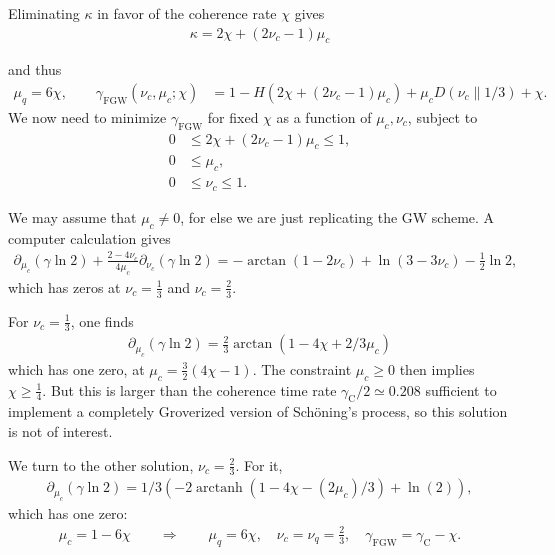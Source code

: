 \documentclass[a4paper,aps,floatfix]{revtex4}
\DeclareMathOperator\arctanh{arctanh}
\begin{document}
Eliminating $\kappa$ in favor of the coherence rate $\chi$ gives
\begin{align*}
	\kappa = 2\chi + (2\nu_c-1)\mu_c
\end{align*}

and thus
\begin{align*}
	\mu_q = 
	6\chi,
	\qquad
	\gamma_{\textrm{FGW}}(\nu_c,\mu_c;\chi) 
	&= 
	1- H( 2 \chi + (2\nu_c-1)\mu_c )
	+ 
	\mu_c D(\nu_c\parallel 1/3)
	+
	\chi.
\end{align*}
We now need to minimize $\gamma_{\textrm{FGW}}$ for fixed $\chi$ as a function of $\mu_c, \nu_c$, subject to
\begin{align*}
	0&\leq
	2\chi + (2\nu_c-1)\mu_c \leq 1, \\
	0 &\leq \mu_c, \\
	0 &\leq \nu_c \leq 1. 
\end{align*}

We may assume that $\mu_c\neq 0$, for else we are just replicating the GW scheme.
A computer calculation \cite{our-data} gives
\begin{align*}
	\partial_{\mu_c} 
	(\gamma \ln 2)
	+ 
	\frac{2-4\nu_c}{4\mu_c} 
	\partial_{\nu_c} 
	(\gamma \ln 2)
	=
	-\arctan(1-2\nu_c) + \ln(3-3\nu_c) - \frac12\ln2,
\end{align*}
which has zeros at $\nu_c=\frac13$ and $\nu_c=\frac23$.

For $\nu_c=\frac13$, one finds
\begin{align*}
	\partial_{\mu_c}
	(\gamma \ln 2)
	=
	\frac23 \arctan(1-4\chi+2/3 \mu_c)
\end{align*}
which has one zero, at $\mu_c = \frac32(4\chi-1)$.
The constraint $\mu_c\geq 0$ then implies $\chi\geq \frac14$.
But this is larger than the coherence time rate $\gamma_{\mathrm{C}}/2\simeq 0.208$ sufficient to implement a completely Groverized version of Sch\"oning's process, so this solution is not of interest.

We turn to the other solution, $\nu_c=\frac23$.
For it,
\begin{align*}
	\partial_{\mu_c}
	(\gamma \ln 2)
	=
	1/3 (-2 \arctanh(1 - 4 \chi - (2 \mu_c)/3) + \ln(2)),
\end{align*}
which has one zero:
\begin{align*}
	\mu_c=1-6\chi
	\qquad
	\Rightarrow
	\qquad
	\mu_q=6\chi,
	\quad
	\nu_c=\nu_q=\frac23,
	\quad
	\gamma_{\mathrm{FGW}} = \gamma_{\mathrm{C}} - \chi.
\end{align*}
\end{document}
